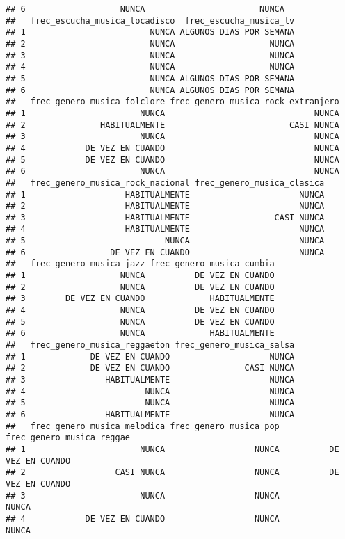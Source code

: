 \documentclass[
]{article}
\begin{document}
\begin{verbatim}
## 6                   NUNCA                       NUNCA
##   frec_escucha_musica_tocadisco  frec_escucha_musica_tv
## 1                         NUNCA ALGUNOS DIAS POR SEMANA
## 2                         NUNCA                   NUNCA
## 3                         NUNCA                   NUNCA
## 4                         NUNCA                   NUNCA
## 5                         NUNCA ALGUNOS DIAS POR SEMANA
## 6                         NUNCA ALGUNOS DIAS POR SEMANA
##   frec_genero_musica_folclore frec_genero_musica_rock_extranjero
## 1                       NUNCA                              NUNCA
## 2               HABITUALMENTE                         CASI NUNCA
## 3                       NUNCA                              NUNCA
## 4            DE VEZ EN CUANDO                              NUNCA
## 5            DE VEZ EN CUANDO                              NUNCA
## 6                       NUNCA                              NUNCA
##   frec_genero_musica_rock_nacional frec_genero_musica_clasica
## 1                    HABITUALMENTE                      NUNCA
## 2                    HABITUALMENTE                      NUNCA
## 3                    HABITUALMENTE                 CASI NUNCA
## 4                    HABITUALMENTE                      NUNCA
## 5                            NUNCA                      NUNCA
## 6                 DE VEZ EN CUANDO                      NUNCA
##   frec_genero_musica_jazz frec_genero_musica_cumbia
## 1                   NUNCA          DE VEZ EN CUANDO
## 2                   NUNCA          DE VEZ EN CUANDO
## 3        DE VEZ EN CUANDO             HABITUALMENTE
## 4                   NUNCA          DE VEZ EN CUANDO
## 5                   NUNCA          DE VEZ EN CUANDO
## 6                   NUNCA             HABITUALMENTE
##   frec_genero_musica_reggaeton frec_genero_musica_salsa
## 1             DE VEZ EN CUANDO                    NUNCA
## 2             DE VEZ EN CUANDO               CASI NUNCA
## 3                HABITUALMENTE                    NUNCA
## 4                        NUNCA                    NUNCA
## 5                        NUNCA                    NUNCA
## 6                HABITUALMENTE                    NUNCA
##   frec_genero_musica_melodica frec_genero_musica_pop frec_genero_musica_reggae
## 1                       NUNCA                  NUNCA          DE VEZ EN CUANDO
## 2                  CASI NUNCA                  NUNCA          DE VEZ EN CUANDO
## 3                       NUNCA                  NUNCA                     NUNCA
## 4            DE VEZ EN CUANDO                  NUNCA                     NUNCA

\end{verbatim}
\end{document}
